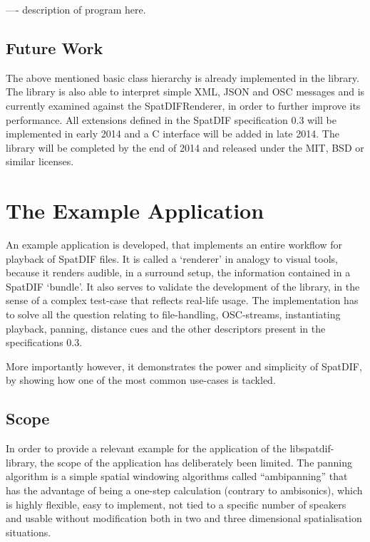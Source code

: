 \documentclass[a4paper]{article}
\begin{document}
---- description of program here.

\subsection{Future Work}

The above mentioned basic class hierarchy is already implemented in the library. The library is also able to interpret simple XML, JSON and OSC messages and is currently examined against  the SpatDIFRenderer, in order to further improve its performance.  All extensions defined in the SpatDIF specification 0.3 will be implemented in early 2014 and a C interface will be added in late 2014. The library will be completed by the end of 2014 and released under the MIT, BSD or similar licenses.

\section{The Example Application}%

An example application is developed, that implements an entire workflow for playback of SpatDIF files. 
It is called a `renderer' in analogy to visual tools, because it renders audible, in a surround setup, the information contained in a SpatDIF `bundle'.
It also serves to validate the development of the library, in the sense of a complex test-case that reflects real-life usage.
The implementation has to solve all the question relating to file-handling, OSC-streams, instantiating playback, panning, distance cues and the other descriptors present in the specifications 0.3.

More importantly however, it demonstrates the power and simplicity of SpatDIF, by showing how one of the most common use-cases is tackled.

\subsection{Scope}

In order to provide a relevant example for the application of the libspatdif-library, the scope of the application has deliberately been limited.
The panning algorithm is a simple spatial windowing algorithms called ``ambipanning'' \cite{Neukom:2008ambipan} that has the advantage of being a one-step calculation (contrary to ambisonics), which is highly flexible, easy to implement, not tied to a specific number of speakers and usable without modification both in two and three dimensional spatialisation situations.
\end{document}
